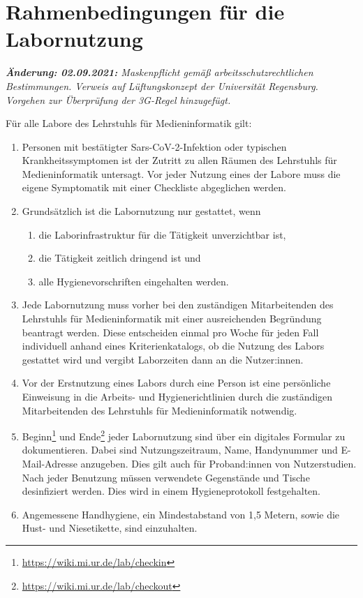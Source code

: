\section{Rahmenbedingungen für die Labornutzung}\label{sec:allgemein}
\emph{\textbf{Änderung: 02.09.2021:} Maskenpflicht gemäß arbeitsschutzrechtlichen Bestimmungen. Verweis auf Lüftungskonzept der Universität Regensburg. Vorgehen zur Überprüfung der 3G-Regel hinzugefügt.}

\noindent
Für alle Labore des Lehrstuhls für Medieninformatik gilt:

\begin{enumerate}
    \item{Personen mit bestätigter Sars-CoV-2-Infektion oder typischen Krankheitssymptomen ist der Zutritt zu allen Räumen des Lehrstuhls für Medieninformatik untersagt. Vor jeder Nutzung eines der Labore muss die eigene Symptomatik mit einer Checkliste abgeglichen werden.}
    \item Grundsätzlich ist die Labornutzung nur gestattet, wenn
    \begin{enumerate}
        \item die Laborinfrastruktur für die Tätigkeit unverzichtbar ist,
        \item die Tätigkeit zeitlich dringend ist und 
        \item alle Hygienevorschriften eingehalten werden.
    \end{enumerate}
    \item{Jede Labornutzung muss vorher bei den zuständigen Mitarbeitenden des Lehrstuhls für Medieninformatik mit einer ausreichenden Begründung beantragt werden. Diese entscheiden einmal pro Woche für jeden Fall individuell anhand eines Kriterienkatalogs, ob die Nutzung des Labors gestattet wird und vergibt Laborzeiten dann an die Nutzer:innen.}
    \item{Vor der Erstnutzung eines Labors durch eine Person ist eine persönliche Einweisung in die Arbeits- und Hygienerichtlinien durch die zuständigen Mitarbeitenden des Lehrstuhls für Medieninformatik notwendig.}
    \item{Beginn\footnote{\url{https://wiki.mi.ur.de/lab/checkin}} und Ende\footnote{\url{https://wiki.mi.ur.de/lab/checkout}} jeder Labornutzung sind über ein digitales Formular zu dokumentieren.
    Dabei sind Nutzungszeitraum, Name, Handynummer und E-Mail-Adresse anzugeben.
    Dies gilt auch für Proband:innen von Nutzerstudien.
    Nach jeder Benutzung müssen verwendete Gegenstände und Tische desinfiziert werden.
    Dies wird in einem Hygieneprotokoll festgehalten.}
    \item{Angemessene Handhygiene, ein Mindestabstand von 1,5 Metern, sowie die Hust- und Niesetikette, sind einzuhalten.

}
\end{enumerate}
